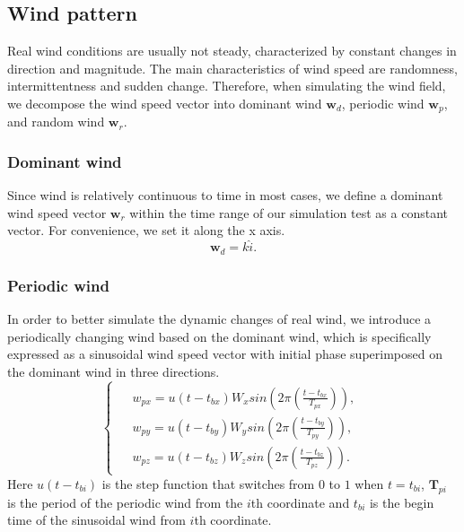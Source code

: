\subsection{Wind pattern}
Real wind conditions are usually not steady, characterized by constant changes in direction and magnitude. 
The main characteristics of wind speed are randomness, intermittentness and sudden change. Therefore, when simulating the wind field, we decompose the wind speed vector into dominant wind $ \boldsymbol{w}_d $, periodic wind $ \boldsymbol{w}_p $, and random wind $ \boldsymbol{w}_r $.

\subsubsection{Dominant wind}
Since wind is relatively continuous to time in most cases, we define a dominant wind speed vector $\boldsymbol{w}_r  $ within the time range of our simulation test as a constant vector. For convenience, we set it along the x axis.\begin{equation}
    \boldsymbol{w}_d=k \hat{i}. 
\end{equation}

\subsubsection{Periodic wind}
In order to better simulate the dynamic changes of real wind, we introduce a periodically changing wind based on the dominant wind, which is specifically expressed as a sinusoidal wind speed vector with initial phase superimposed on the dominant wind in three directions.
\begin{equation}
        \left\{\begin{array}{c} 
            \begin{aligned}   
            &w_{px}=u \left(t-t_{bx}\right)W_{x}sin\left(2\pi\left(\frac{t-t_{bx}}{T_{px}}\right)\right),\\
            &w_{py}=u \left(t-t_{by}\right)W_{y}sin\left(2\pi\left(\frac{t-t_{by}}{T_{py}}\right)\right),\\
            &w_{pz}=u \left(t-t_{bz}\right)W_{z}sin\left(2\pi\left(\frac{t-t_{bz}}{T_{pz}}\right)\right).
            \end{aligned}
            \end{array}
            \right.
\end{equation}
Here $ u(t-t_{bi})$ is the step function that switches from $ 0 $ to $ 1 $ when $ t=t_{bi} $, $ \boldsymbol{T}_{pi} $ is the period of the periodic wind from the $ i $th coordinate and $t_{bi} $ is the begin time of the sinusoidal wind from $ i $th coordinate.


